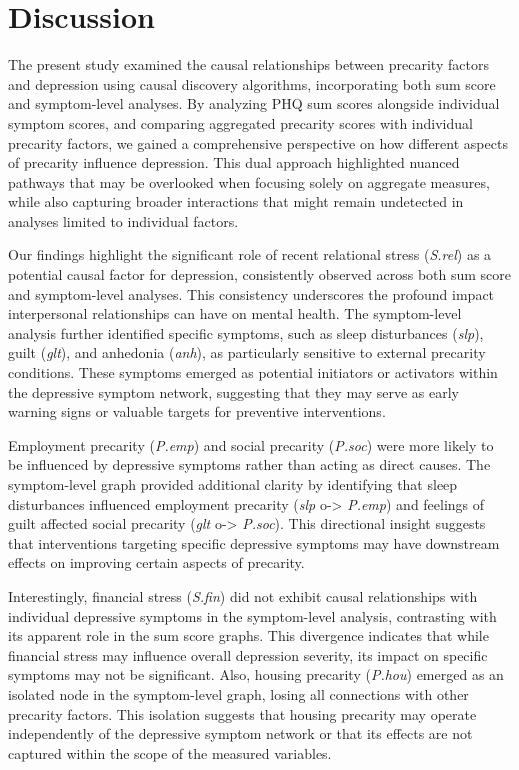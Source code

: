 \documentclass[
]{article}
\begin{document}
\section{Discussion}\label{discussion}

The present study examined the causal relationships between precarity
factors and depression using causal discovery algorithms, incorporating
both sum score and symptom-level analyses. By analyzing PHQ sum scores
alongside individual symptom scores, and comparing aggregated precarity
scores with individual precarity factors, we gained a comprehensive
perspective on how different aspects of precarity influence depression.
This dual approach highlighted nuanced pathways that may be overlooked
when focusing solely on aggregate measures, while also capturing broader
interactions that might remain undetected in analyses limited to
individual factors.

Our findings highlight the significant role of recent relational stress
(\emph{S.rel}) as a potential causal factor for depression, consistently
observed across both sum score and symptom-level analyses. This
consistency underscores the profound impact interpersonal relationships
can have on mental health. The symptom-level analysis further identified
specific symptoms, such as sleep disturbances (\emph{slp}), guilt
(\emph{glt}), and anhedonia (\emph{anh}), as particularly sensitive to
external precarity conditions. These symptoms emerged as potential
initiators or activators within the depressive symptom network,
suggesting that they may serve as early warning signs or valuable
targets for preventive interventions.

Employment precarity (\emph{P.emp}) and social precarity (\emph{P.soc})
were more likely to be influenced by depressive symptoms rather than
acting as direct causes. The symptom-level graph provided additional
clarity by identifying that sleep disturbances influenced employment
precarity (\emph{slp} o-\textgreater{} \emph{P.emp}) and feelings of
guilt affected social precarity (\emph{glt} o-\textgreater{}
\emph{P.soc}). This directional insight suggests that interventions
targeting specific depressive symptoms may have downstream effects on
improving certain aspects of precarity.

Interestingly, financial stress (\emph{S.fin}) did not exhibit causal
relationships with individual depressive symptoms in the symptom-level
analysis, contrasting with its apparent role in the sum score graphs.
This divergence indicates that while financial stress may influence
overall depression severity, its impact on specific symptoms may not be
significant. Also, housing precarity (\emph{P.hou}) emerged as an
isolated node in the symptom-level graph, losing all connections with
other precarity factors. This isolation suggests that housing precarity
may operate independently of the depressive symptom network or that its
effects are not captured within the scope of the measured variables.
\end{document}
